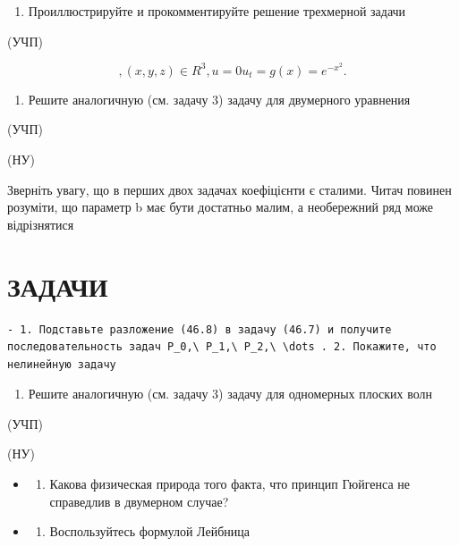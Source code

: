 \documentclass[
  ukrainian,
]{article}
\providecommand{\tightlist}{%
  \setlength{\itemsep}{0pt}\setlength{\parskip}{0pt}}
\begin{document}
\begin{enumerate}
\def\labelenumi{\arabic{enumi}.}
\setcounter{enumi}{2}
\tightlist
\item
  Проиллюстрируйте и прокомментируйте решение трехмерной задачи
\end{enumerate}

(УЧП)

\[
,  (x,  y, z) \in R^3  ,  u = 0   u_t =
g(x) = e^{-x^2}.
\]

\begin{enumerate}
\def\labelenumi{\arabic{enumi}.}
\setcounter{enumi}{3}
\tightlist
\item
  Решите аналогичную (см. задачу 3) задачу для двумерного уравнения
\end{enumerate}

(УЧП)

(НУ)

Зверніть увагу, що в перших двох задачах коефіцієнти є сталими. Читач
повинен розуміти, що параметр b має бути достатньо малим, а необережний
ряд може відрізнятися

\section{ЗАДАЧИ}\label{ux437ux430ux434ux430ux447ux438-11}

\begin{verbatim}
- 1. Подставьте разложение (46.8) в задачу (46.7) и получите последовательность задач P_0,\ P_1,\ P_2,\ \dots . 2. Покажите, что нелинейную задачу
\end{verbatim}

\begin{enumerate}
\def\labelenumi{\arabic{enumi}.}
\setcounter{enumi}{4}
\tightlist
\item
  Решите аналогичную (см. задачу 3) задачу для одномерных плоских волн
\end{enumerate}

(УЧП)

(НУ)

\begin{itemize}
\tightlist
\item
  \begin{enumerate}
  \def\labelenumi{\arabic{enumi}.}
  \setcounter{enumi}{5}
  \tightlist
  \item
    Какова физическая природа того факта, что принцип Гюйгенса не
    справедлив в двумерном случае?
  \end{enumerate}
\item
  \begin{enumerate}
  \def\labelenumi{\arabic{enumi}.}
  \setcounter{enumi}{6}
  \tightlist
  \item
    Воспользуйтесь формулой Лейбница
  \end{enumerate}
\end{itemize}
\end{document}

